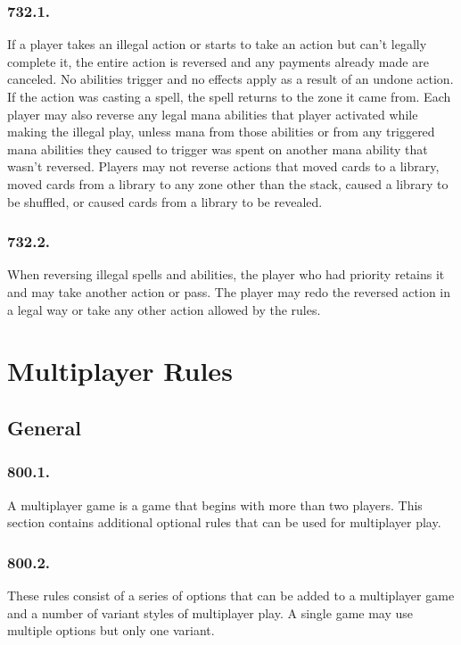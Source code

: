 \subsection*{732.1.}
If a player takes an illegal action or starts to take an action but can’t legally complete it, the entire action is reversed and any payments already made are canceled. No abilities trigger and no effects apply as a result of an undone action. If the action was casting a spell, the spell returns to the zone it came from. Each player may also reverse any legal mana abilities that player activated while making the illegal play, unless mana from those abilities or from any triggered mana abilities they caused to trigger was spent on another mana ability that wasn’t reversed. Players may not reverse actions that moved cards to a library, moved cards from a library to any zone other than the stack, caused a library to be shuffled, or caused cards from a library to be revealed.

\subsection*{732.2.}
When reversing illegal spells and abilities, the player who had priority retains it and may take another action or pass. The player may redo the reversed action in a legal way or take any other action allowed by the rules.

\chapter{Multiplayer Rules}
\setcounter{section}{799}
\section{General}
\subsection*{800.1.}
A multiplayer game is a game that begins with more than two players. This section contains additional optional rules that can be used for multiplayer play.

\subsection*{800.2.}
These rules consist of a series of options that can be added to a multiplayer game and a number of variant styles of multiplayer play. A single game may use multiple options but only one variant.


